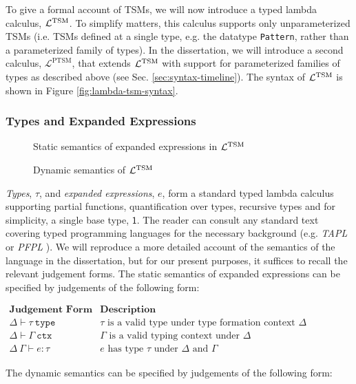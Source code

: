 To give a formal account of TSMs, we will now introduce a typed lambda calculus, $\mathcal{L}^\text{TSM}$. To simplify matters, this calculus supports only unparameterized TSMs (i.e. TSMs defined at a single type, e.g. the datatype \lstinline{Pattern}, rather than a parameterized family of types). In the dissertation, we will introduce a second calculus, $\mathcal{L}^\text{PTSM}$, that extends $\mathcal{L}^\text{TSM}$ with support for parameterized families of types as described above (see Sec. \ref{sec:syntax-timeline}). The syntax of $\mathcal{L}^\text{TSM}$ is shown in Figure \ref{fig:lambda-tsm-syntax}.

\subsubsection{Types and Expanded Expressions}
\begin{figure}
\caption{Static semantics of expanded expressions in $\mathcal{L}^\text{TSM}$}
\label{fig:expanded-statics}
\end{figure}
\begin{figure}
\caption{Dynamic semantics of $\mathcal{L}^\text{TSM}$}
\label{fig:expanded-dynamics}
\end{figure}
\emph{Types}, $\tau$, and \emph{expanded expressions}, $e$, form a standard typed lambda calculus supporting partial functions, quantification over types, recursive types and for simplicity, a single base type, $\mathsf{1}$. The reader can consult any standard text covering typed programming languages for the necessary background (e.g. \emph{TAPL} \cite{tapl} or \emph{PFPL} \cite{pfpl}). We will reproduce a more detailed account of the semantics of the language in the dissertation, but for our present purposes, it suffices to recall the relevant judgement forms. The static  semantics of expanded expressions can be specified by judgements of the following form:

$\begin{array}{ll}
\textbf{Judgement Form} & \textbf{Description}\\
\Delta \vdash \tau~\mathtt{type} & \text{$\tau$ is a valid type under type formation context $\Delta$}\\
\Delta \vdash \Gamma~\mathtt{ctx} & \text{$\Gamma$ is a valid typing context under $\Delta$}\\
\Delta~\Gamma \vdash e : \tau & \text{$e$ has type $\tau$ under $\Delta$ and $\Gamma$}
\end{array}$

\noindent
The dynamic semantics can be specified by judgements of the following form:

